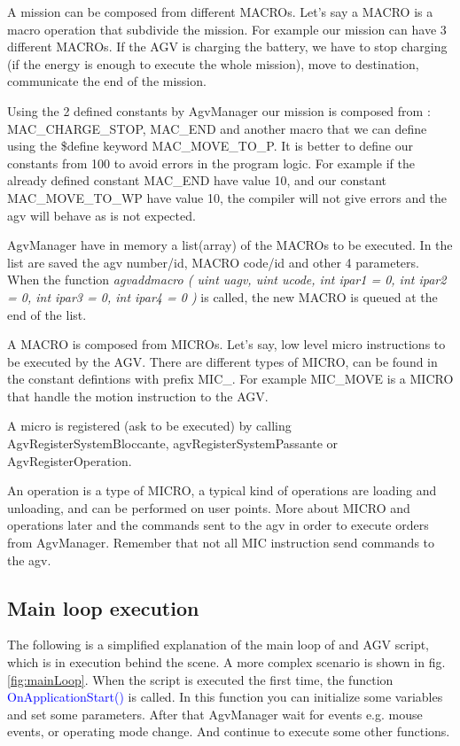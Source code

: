 A mission can be composed from different MACROs. Let's say a MACRO is a macro operation that subdivide the mission. For example our mission can have 3 different MACROs. If the AGV is charging the battery, we have to stop charging (if the energy is enough to execute the whole mission), move to destination, communicate the end of the mission.

Using the 2 defined constants by AgvManager our mission is composed from : MAC\_CHARGE\_STOP, MAC\_END and another macro that we can define using the \$define keyword MAC\_MOVE\_TO\_P.
It is better to define our constants from 100 to avoid errors in the program logic. For example if the already defined constant MAC\_END have value 10, and our constant MAC\_MOVE\_TO\_WP have value 10, the compiler will not give errors and the agv will behave as is not expected.

AgvManager have in memory a list(array) of the MACROs to be executed. In the list are saved the agv number/id, MACRO code/id and other 4 parameters. 
When the function 
\textit{agvaddmacro	(	uint 	uagv,
	uint 	ucode,
	int 	ipar1 = 0,
	int 	ipar2 = 0,
	int 	ipar3 = 0,
	int 	ipar4 = 0 
	)		} 
is called, the new MACRO is queued at the end of the list.

A MACRO is composed from MICROs. Let's say, low level micro instructions to be executed by the AGV. There are different types of MICRO, can be found in the constant defintions with prefix MIC\_. For example MIC\_MOVE is a MICRO that handle the motion instruction to the AGV.

A micro is registered (ask to be executed) by calling AgvRegisterSystemBloccante, agvRegisterSystemPassante or AgvRegisterOperation.

An operation is a type of MICRO, a typical kind of operations are loading and unloading, and can be performed on user points.
More about MICRO and operations later and the commands sent to the agv in order to execute orders from AgvManager. Remember that not all MIC instruction send commands to the agv. 

\subsection{Main loop execution}
The following is a simplified explanation of the main loop of and AGV script, which is in execution behind the scene. A more complex scenario is shown in fig.\ref{fig:mainLoop}.
When the script is executed the first time, the function \textcolor{blue}{OnApplicationStart()} is called. In this function you can initialize some variables and set some parameters. After that AgvManager wait for events e.g. mouse events, or operating mode change. And continue to execute some other functions.

